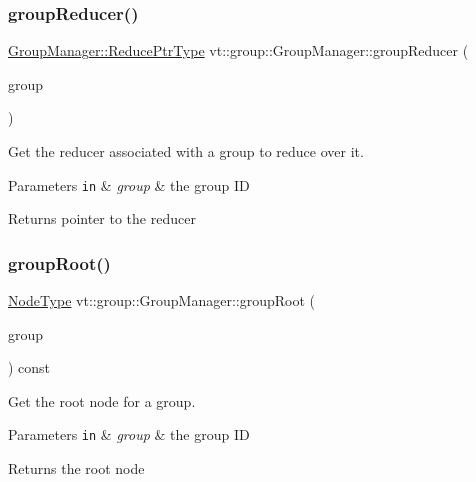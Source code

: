 \subsubsection{\texorpdfstring{group\+Reducer()}{groupReducer()}}
{\footnotesize\ttfamily \hyperlink{structvt_1_1group_1_1_group_manager_a0c646983506b624ad93ceb127df9e811}{Group\+Manager\+::\+Reduce\+Ptr\+Type} vt\+::group\+::\+Group\+Manager\+::group\+Reducer (\begin{DoxyParamCaption}\item[{\hyperlink{namespacevt_a27b5e4411c9b6140c49100e050e2f743}{Group\+Type} const \&}]{group }\end{DoxyParamCaption})}



Get the reducer associated with a group to reduce over it. 


\begin{DoxyParams}[1]{Parameters}
\mbox{\tt in}  & {\em group} & the group ID\\
\hline
\end{DoxyParams}
\begin{DoxyReturn}{Returns}
pointer to the reducer 
\end{DoxyReturn}
\mbox{\label{structvt_1_1group_1_1_group_manager_ae813f2b894016f05569d7d06aae55315}} 
\subsubsection{\texorpdfstring{group\+Root()}{groupRoot()}}
{\footnotesize\ttfamily \hyperlink{namespacevt_a866da9d0efc19c0a1ce79e9e492f47e2}{Node\+Type} vt\+::group\+::\+Group\+Manager\+::group\+Root (\begin{DoxyParamCaption}\item[{\hyperlink{namespacevt_a27b5e4411c9b6140c49100e050e2f743}{Group\+Type} const \&}]{group }\end{DoxyParamCaption}) const}



Get the root node for a group. 


\begin{DoxyParams}[1]{Parameters}
\mbox{\tt in}  & {\em group} & the group ID\\
\hline
\end{DoxyParams}
\begin{DoxyReturn}{Returns}
the root node 
\end{DoxyReturn}
\mbox{\label{structvt_1_1group_1_1_group_manager_a9a0520b8e8e35f0f0127db0669c9b648}} 
